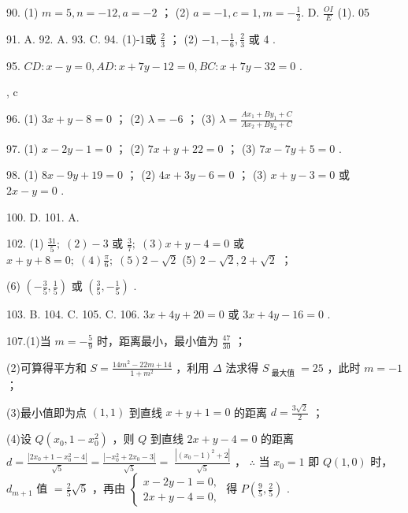 \documentclass[10pt]{article}
\begin{document}
90. (1) \(m = 5,n =  - {12},a =  - 2\) ； (2) \(a =  - 1,c = 1,m =  - \frac{1}{2}.\) D. \(\frac{OI}{E}\) (1). 05

91. A. 92. A. 93. C. 94. (1)-1或 \(\frac{2}{3}\) ； (2) \(- 1, - \frac{1}{6},\frac{2}{3}\) 或 4 .

95. \({CD} : x - y = 0,{AD} : x + {7y} - {12} = 0,{BC} : x + {7y} - {32} = 0\) .

, c

96. (1) \({3x} + y - 8 = 0\) ； (2) \(\lambda  =  - 6\) ； (3) \(\lambda  = \frac{A{x}_{1} + B{y}_{1} + C}{A{x}_{2} + B{y}_{2} + C}\)

97. (1) \(x - {2y} - 1 = 0\) ； (2) \({7x} + y + {22} = 0\) ； (3) \({7x} - {7y} + 5 = 0\) .

98. (1) \({8x} - {9y} + {19} = 0\) ； (2) \({4x} + {3y} - 6 = 0\) ； (3) \(x + y - 3 = 0\) 或 \({2x} - y = 0\) .

100. D. 101. A.

102. (1) \(\frac{31}{5};\;\left( 2\right)  - 3\) 或 \(\frac{3}{7};\;\left( 3\right) x + y - 4 = 0\) 或 \(x + y + 8 = 0;\;\left( 4\right) \frac{\pi }{6};\;\left( 5\right) 2 - \sqrt{2}\) (5) \(2 - \sqrt{2},2 + \sqrt{2}\) ；

(6) \(\left( {-\frac{3}{5},\frac{1}{5}}\right)\) 或 \(\left( {\frac{3}{5}, - \frac{1}{5}}\right)\) .

103. B. 104. C. 105. C. 106. \({3x} + {4y} + {20} = 0\) 或 \({3x} + {4y} - {16} = 0\) .

107.(1)当 \(m =  - \frac{5}{9}\) 时，距离最小，最小值为 \(\frac{47}{30}\) ；

(2)可算得平方和 \(S = \frac{{14}{m}^{2} - {22m} + {14}}{1 + {m}^{2}}\) ，利用 \(\Delta\) 法求得 \({S}_{\text{ 最大值 }} = {25}\) ，此时 \(m =  - 1\) ；

(3)最小值即为点 \(\left( {1,1}\right)\) 到直线 \(x + y + 1 = 0\) 的距离 \(d = \frac{3\sqrt{2}}{2}\) ；

(4)设 \(Q\left( {{x}_{0},1 - {x}_{0}^{2}}\right)\) ，则 \(Q\) 到直线 \({2x} + y - 4 = 0\) 的距离 \(d = \frac{\left| 2{x}_{0} + 1 - {x}_{0}^{2} - 4\right| }{\sqrt{5}} = \frac{\left| -{x}_{0}^{2} + 2{x}_{0} - 3\right| }{\sqrt{5}} = \; \frac{\left| {\left( {x}_{0} - 1\right) }^{2} + 2\right| }{\sqrt{5}}\) ， \(\therefore\) 当 \({x}_{0} = 1\) 即 \(Q\left( {1,0}\right)\) 时， \({d}_{m + 1}\) 值 \(= \frac{2}{5}\sqrt{5}\) ，再由 \(\left\{  \begin{array}{l} x - {2y} - 1 = 0, \\  {2x} + y - 4 = 0, \end{array}\right.\) 得 \(P\left( {\frac{9}{5},\frac{2}{5}}\right)\) .
\end{document}
